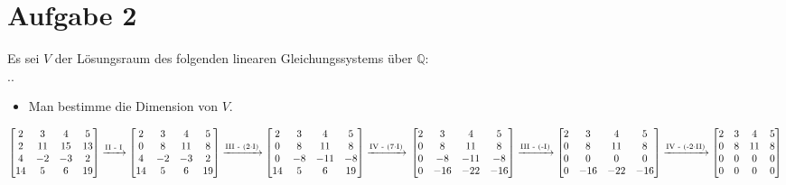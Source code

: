 \section*{Aufgabe 2}

Es sei $V$ der Lösungsraum des folgenden linearen Gleichungssystems über $\mathbb{Q}$:\\

\sysdelim..\\

\begin{itemize}[leftmargin=*, label={a)}]
\item Man bestimme die Dimension von $V$.
\end{itemize}

$
\begin{bmatrix}
2 & 3 & 4 & 5\\
2 & 11 & 15 & 13\\
4 & -2 & -3 & 2\\
14 & 5 & 6 & 19\\
\end{bmatrix}
\xrightarrow{\text{II - I}}
\begin{bmatrix}
2 & 3 & 4 & 5\\
0 & 8 & 11 & 8\\
4 & -2 & -3 & 2\\
14 & 5 & 6 & 19\\
\end{bmatrix}
\xrightarrow{\text{III - (2} \cdot \text{I)}}
\begin{bmatrix}
2 & 3 & 4 & 5\\
0 & 8 & 11 & 8\\
0 & -8 & -11 & -8\\
14 & 5 & 6 & 19\\
\end{bmatrix}
\xrightarrow{\text{IV - (7} \cdot \text{I)}}\\~\\~\\
\begin{bmatrix}
2 & 3 & 4 & 5\\
0 & 8 & 11 & 8\\
0 & -8 & -11 & -8\\
0 & -16 & -22 & -16\\
\end{bmatrix}
\xrightarrow{\text{III - (-I)}}
\begin{bmatrix}
2 & 3 & 4 & 5\\
0 & 8 & 11 & 8\\
0 & 0 & 0 & 0\\
0 & -16 & -22 & -16\\
\end{bmatrix}
\xrightarrow{\text{IV - (-2} \cdot \text{II)}}
\begin{bmatrix}
2 & 3 & 4 & 5\\
0 & 8 & 11 & 8\\
0 & 0 & 0 & 0\\
0 & 0 & 0 & 0\\
\end{bmatrix}
$\\~\\

